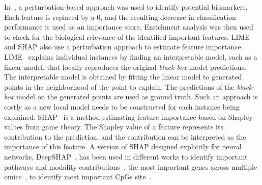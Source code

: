 \documentclass[../main.tex]{subfiles}
\begin{document}
	In~\cite{MOGONET}, a perturbation-based approach was used to identify potential biomarkers.
	Each feature is replaced by a 0, and the resulting decrease in classification performance is used as an importance score.
	Enrichment analysis was then used to check for the biological relevance of the identified important features.
	LIME and SHAP also use a perturbation approach to estimate feature importance.
	LIME~\cite{LIME} explains individual instances by finding an interpretable model, such as a linear model, that locally reproduces the original \emph{black-box} model predictions.
	The interpretable model is obtained by fitting the linear model to generated points in the neighborhood of the point to explain.
	The predictions of the \emph{black-box} model on the generated points are used as ground truth.
	Such an approach is costly as a new local model needs to be constructed for each instance being explained.
	SHAP~\cite{SHAP} is a method estimating feature importance based on Shapley values from game theory.
	The Shapley value of a feature represents its contribution to the prediction, and the contribution can be interpreted as the importance of this feature.
	A version of SHAP designed explicitly for neural networks, DeepSHAP~\cite{DeepSHAP}, has been used in different works to identify important pathways and modality contributions~\cite{Liu2024}, the most important genes across multiple omics~\cite{Withnell2021,customics}, to identify most important CpGs site~\cite{levyMethylNetAutomatedModular2020a}.
\end{document}
